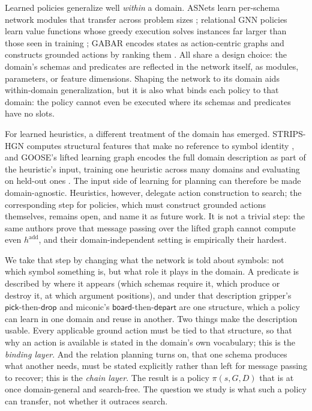 \documentclass[letterpaper]{article} %
\begin{document}
Learned policies generalize well \emph{within} a domain. ASNets learn
per-schema network modules that transfer across problem sizes
\citep{toyer2020asnets}; relational GNN policies learn value functions whose
greedy execution solves instances far larger than those seen in training
\citep{expressive_v1, policy_beyond_c2}; GABAR encodes states as
action-centric graphs and constructs grounded actions by ranking them
\citep{gabar}. All share a design choice: the domain's schemas and predicates
are reflected in the network itself, as modules, parameters, or feature
dimensions. Shaping the network to its domain aids within-domain
generalization, but it is also what binds each policy to that domain: the
policy cannot even be executed where its schemas and predicates have no
slots.

For learned heuristics, a different treatment of the domain has emerged.
STRIPS-HGN computes structural features that make no reference to symbol
identity \citep{strips_hgn}, and GOOSE's lifted learning graph encodes the
full domain description as part of the heuristic's input, training one
heuristic across many domains and evaluating on held-out ones
\citep{goose_v2}. The input side of learning for planning can therefore be
made domain-agnostic. Heuristics, however, delegate action construction to
search; the corresponding step for policies, which must construct grounded
actions themselves, remains open, and \citet{goose_v2} name it as future
work. It is not a trivial step: the same authors prove that message passing
over the lifted graph cannot compute even $h^{\mathrm{add}}$, and their
domain-independent setting is empirically their hardest.

We take that step by changing what the network is told about symbols: not
which symbol something is, but what role it plays in the domain. A predicate
is described by where it appears (which schemas require it, which produce or
destroy it, at which argument positions), and under that description
gripper's $\textsf{pick}$-then-$\textsf{drop}$ and miconic's
$\textsf{board}$-then-$\textsf{depart}$ are one structure, which a policy can
learn in one domain and reuse in another. Two things make the description
usable. Every applicable ground action must be tied to that structure, so
that why an action is available is stated in the domain's own vocabulary;
this is the \emph{binding layer}. And the relation planning turns on, that
one schema produces what another needs, must be stated explicitly rather
than left for message passing to recover; this is the \emph{chain layer}.
The result is a policy $\pi(s, G, D)$ that is at once domain-general and
search-free. The question we study is what such a policy can transfer, not
whether it outraces search.
\end{document}
